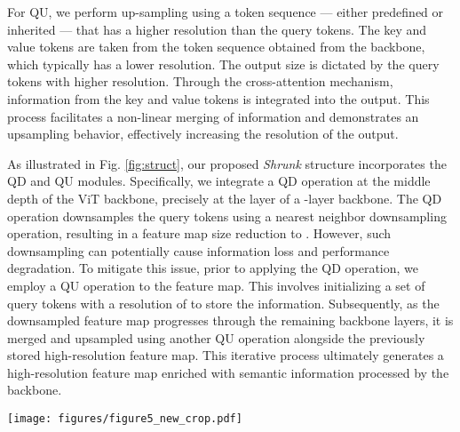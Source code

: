 For QU, we perform up-sampling using a token sequence — either predefined or inherited — that has a higher resolution than the query tokens.
The key and value tokens are taken from the token sequence obtained from the backbone, which typically has a lower resolution. The output size is dictated by the query tokens with higher resolution. Through the cross-attention mechanism, information from the key and value tokens is integrated into the output. This process facilitates a non-linear merging of information and demonstrates an upsampling behavior, effectively increasing the resolution of the output.


As illustrated in Fig. \ref{fig:struct}, our proposed \emph{Shrunk} structure incorporates the QD and QU modules. Specifically, we integrate a QD operation at the middle depth of the ViT backbone, precisely at the  layer of a -layer backbone. The QD operation downsamples the query tokens using a  nearest neighbor downsampling operation, resulting in a feature map size reduction to . However, such downsampling can potentially cause information loss and performance degradation. To mitigate this issue, prior to applying the QD operation, we employ a QU operation to the feature map. This involves initializing a set of query tokens with a resolution of  to store the information. Subsequently, as the downsampled feature map progresses through the remaining backbone layers, it is merged and upsampled using another QU operation alongside the previously stored  high-resolution feature map. This iterative process ultimately generates a  high-resolution feature map enriched with semantic information processed by the backbone.


\begin{figure*}[t]
    \centering
    \texttt{[image: figures/figure5\_new\_crop.pdf]}
    \caption{
    \textbf{Illustrations of the \emph{Shrunk} and \emph{Shrunk++}.
    } In the diagram, the \textcolor{blue}{blue} and \textcolor{orange}{orange} boxes respectively refer to the transformer encoder block and the patch embedding block. In SegVit~\cite{zhang2022segvit}, the proposed \emph{Shrunk} structure employs query downsampling (QD) on the middle-level features to preserve the information.  In the new \emph{Shrunk++} architecture, we introduce the Edged Query Downsampling (EQD) technique which consolidates every four adjacent tokens into one token and additionally includes the tokens that contain edges. 
    This enhancement enables downsampling operations to take place before the first layer without significant performance degradation, offering computational savings for the initial layers of the \emph{Shrunk} model. The edge information is extracted using a lightweight parallel edge detection head.}
    \label{fig:struct}
\end{figure*}

